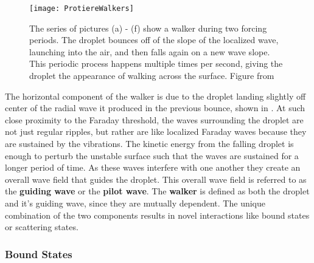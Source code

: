  \begin{figure}[h]
	       \centering
	    \texttt{[image: ProtiereWalkers]}
	     \caption{%
	    The series of pictures (a) - (f) show a walker during two forcing periods. The droplet bounces off of the slope of the localized wave, launching into the air, and then falls again on a new wave slope. This periodic process happens multiple times per second, giving the droplet the appearance of walking across the surface. Figure from~ 
	     }
	 \label{Couderwalkers}
	\end{figure}
 
 
The horizontal component of the walker is due to the droplet landing slightly off center of the radial wave it produced in the previous bounce, shown in . At such close proximity to the Faraday threshold, the waves surrounding the droplet are not just regular ripples, but rather are like localized Faraday waves because they are sustained by the vibrations. The kinetic energy from the falling droplet is enough to perturb the unstable surface such that the waves are sustained for a longer period of time. As these waves interfere with one another they create an overall wave field that guides the droplet. This overall wave field is referred to as the \textbf{guiding wave} or the \textbf{pilot wave}. The \textbf{walker} is defined as both the droplet and it's guiding wave, since they are mutually dependent. The unique combination of the two components results in novel interactions like bound states or scattering states.



\subsubsection{Bound States}

